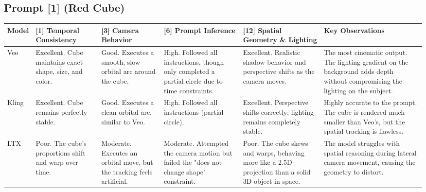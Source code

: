 \documentclass[sigconf]{acmart}
\begin{document}
\subsection*{Prompt [1] (Red Cube)}
\begin{table}[t]
    \centering
    \renewcommand{\arraystretch}{1.3}
    \begin{tabularx}{\textwidth}{| l | >{\raggedright\arraybackslash}X | >{\raggedright\arraybackslash}X | >{\raggedright\arraybackslash}X | >{\raggedright\arraybackslash}X | >{\raggedright\arraybackslash}X |}
        \hline
        \textbf{Model} & \textbf{[1] Temporal Consistency}                                                & \textbf{[3] Camera Behavior}                                                         & \textbf{[6] Prompt Inference}                                                                    & \textbf{[12] Spatial Geometry \& Lighting}                                                            & \textbf{Key Observations}                                                                                                       \\ \hline
        Veo            & Excellent. Cube maintains exact shape, size, and color.                          & Good. Executes a smooth, slow orbital arc around the cube.                           & High. Followed all instructions, though only completed a partial circle due to time constraints. & Excellent. Realistic shadow behavior and perspective shifts as the camera moves.                      & The most cinematic output. The lighting gradient on the background adds depth without compromising the lighting on the subject. \\ \hline
        Kling          & Excellent. Cube remains perfectly stable.                                        & Good. Executes a clean orbital arc, similar to Veo.                                  & High. Followed all instructions (partial circle).                                                & Excellent. Perspective shifts correctly; lighting remains completely stable.                          & Highly accurate to the prompt. The cube is rendered much smaller than Veo's, but the spatial tracking is flawless.              \\ \hline
        LTX            & Poor. The cube's proportions shift and warp over time.                           & Moderate. Executes an orbital move, but the tracking feels artificial.               & Moderate. Attempted the camera motion but failed the "does not change shape" constraint.         & Poor. The cube skews and warps, behaving more like a 2.5D projection than a solid 3D object in space. & The model struggles with spatial reasoning during lateral camera movement, causing the geometry to distort.                     \\ \hline

\end{tabularx}
\end{table}
\end{document}
